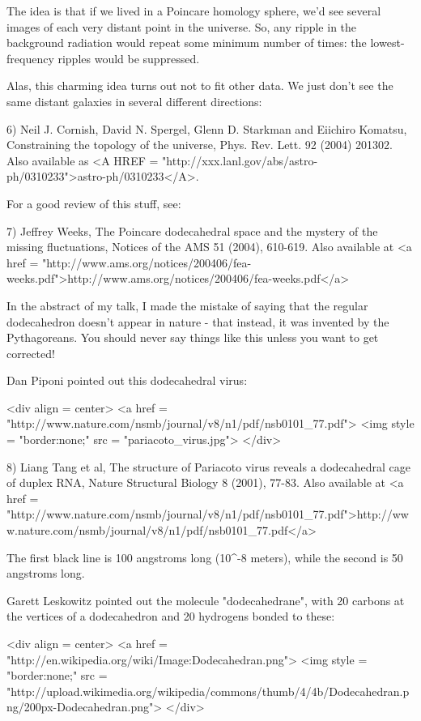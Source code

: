 The idea is that if we lived in a Poincare homology sphere, we'd 
see several images of each very distant point in the universe.  So, 
any ripple in the background radiation would repeat some minimum
number of times: the lowest-frequency ripples would be suppressed.

Alas, this charming idea turns out not to fit other data.  We just
don't see the same distant galaxies in several different directions:

6) Neil J. Cornish, David N. Spergel, Glenn D. Starkman and Eiichiro
Komatsu, Constraining the topology of the universe,
Phys. Rev. Lett. 92 (2004) 201302.  Also available as <A HREF =
"http://xxx.lanl.gov/abs/astro-ph/0310233">astro-ph/0310233</A>.

For a good review of this stuff, see:

7) Jeffrey Weeks, The Poincare dodecahedral space and the mystery
of the missing fluctuations, Notices of the AMS 51 (2004), 610-619. 
Also available at <a href = "http://www.ams.org/notices/200406/fea-weeks.pdf">http://www.ams.org/notices/200406/fea-weeks.pdf</a>

In the abstract of my talk, I made the mistake of saying that 
the regular dodecahedron doesn't appear in nature - that instead, 
it was invented by the Pythagoreans.  You should never say things 
like this unless you want to get corrected!

Dan Piponi pointed out this dodecahedral virus:

<div align = center>
<a href = "http://www.nature.com/nsmb/journal/v8/n1/pdf/nsb0101_77.pdf">
<img style = "border:none;" src = "pariacoto_virus.jpg">
</div>

8) Liang Tang et al, The structure of Pariacoto virus reveals a 
dodecahedral cage of duplex RNA, Nature Structural Biology 8
(2001), 77-83.  Also available at
<a href = "http://www.nature.com/nsmb/journal/v8/n1/pdf/nsb0101_77.pdf">http://www.nature.com/nsmb/journal/v8/n1/pdf/nsb0101_77.pdf</a>


The first black line is 100 angstroms long (10^{-8} meters),
while the second is 50 angstroms long.

Garett Leskowitz pointed out the molecule "dodecahedrane", with
20 carbons at the vertices of a dodecahedron and 20 hydrogens bonded
to these:

<div align = center>
<a href = "http://en.wikipedia.org/wiki/Image:Dodecahedran.png">
<img style = "border:none;" src = "http://upload.wikimedia.org/wikipedia/commons/thumb/4/4b/Dodecahedran.png/200px-Dodecahedran.png">
</div>

